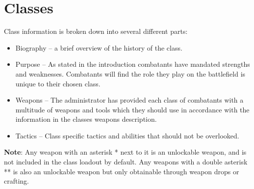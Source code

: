 \section{Classes}

Class information is broken down into several different parts:
\begin{itemize}
	\item Biography – a brief overview of the history of the class.
	\item Purpose – As stated in the introduction combatants have mandated strengths and weaknesses.  Combatants will find the role they play on the battlefield is unique to  their chosen class. 
	\item Weapons – The administrator has provided each class of combatants with a multitude of weapons and tools which they should use in accordance with the information in the classes weapons description. 
	\item Tactics – Class specific tactics and abilities that should not be overlooked.
\end{itemize}
\textbf{Note}: Any weapon with an asterisk * next to it is an unlockable weapon, and is not included in the class loadout by default. Any weapons with a double asterisk ** is also an unlockable weapon but only obtainable through weapon drops or crafting.

\newpage


\newpage


\newpage


\newpage


\newpage



\newpage


\newpage


\newpage


\newpage


